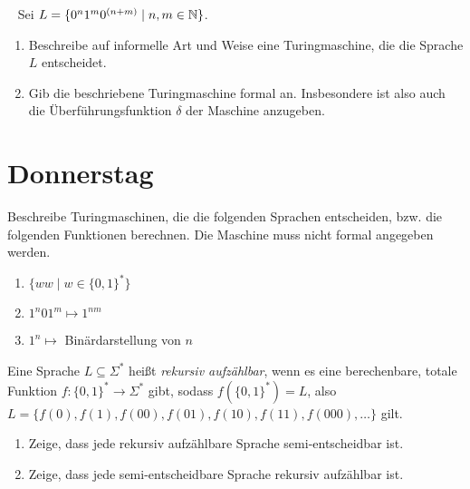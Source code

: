 \documentclass{uebung_cs}
\begin{document}
\begin{aufgabe}\
	Sei $L = \{0^n 1^m 0^{(n+m)} \;|\; n,m \in \mathbb{N}\}$.
	\begin{enumerate}
		\item Beschreibe auf informelle Art und Weise eine Turingmaschine, die die Sprache $L$ entscheidet.
		\item Gib die beschriebene Turingmaschine formal an. Insbesondere ist also auch die Überführungsfunktion $\delta$ der Maschine anzugeben.		
	\end{enumerate}
\end{aufgabe}

\section*{Donnerstag}

\begin{aufgabe}[Turingmaschinen IV]
	Beschreibe Turingmaschinen, die die folgenden Sprachen entscheiden, bzw. die folgenden Funktionen berechnen. Die Maschine muss nicht formal angegeben werden.
	\begin{enumerate}
		\item $\{ww \;|\; w \in \{0,1\}^*\}$
		\item $1^n 0 1^m \mapsto 1^{nm}$
		\item $1^n \mapsto$ Binärdarstellung von $n$
	\end{enumerate}
\end{aufgabe}

\begin{aufgabe}
	Eine Sprache $L \subseteq \Sigma^*$ heißt \emph{rekursiv aufzählbar}, wenn es eine berechenbare, totale Funktion $f \colon \{0,1\}^* \rightarrow \Sigma^*$ gibt, sodass $f(\{0,1\}^*) = L$, also $L = \{f(0), f(1), f(00), f(01), f(10), f(11), f(000), \dots\}$ gilt.
	\begin{enumerate}
		\item Zeige, dass jede rekursiv aufzählbare Sprache semi-entscheidbar ist.
		\item Zeige, dass jede semi-entscheidbare Sprache rekursiv aufzählbar ist.
	\end{enumerate}
\end{aufgabe}
\end{document}

